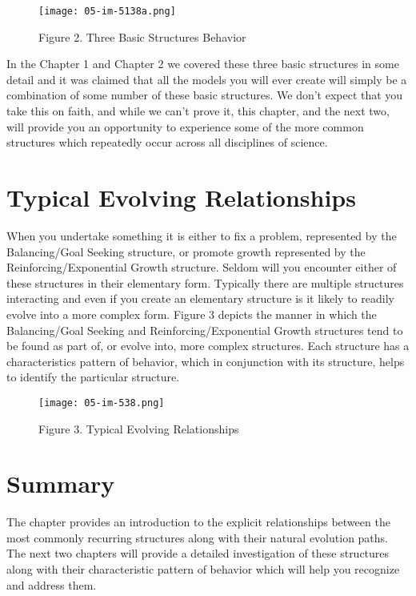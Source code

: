 \documentclass[]{memoir}
\let\Oldincludegraphics\includegraphics
\renewcommand{\includegraphics}[1]{\Oldincludegraphics[max size={\textwidth}{\textheight}]{#1}}
\begin{document}
\begin{figure}[htbp]
\centering
\texttt{[image: 05-im-5138a.png]}
\caption{Figure 2. Three Basic Structures Behavior}
\end{figure}

In the Chapter 1 and Chapter 2 we covered these three basic structures
in some detail and it was claimed that all the models you will ever
create will simply be a combination of some number of these basic
structures. We don't expect that you take this on faith, and while we
can't prove it, this chapter, and the next two, will provide you an
opportunity to experience some of the more common structures which
repeatedly occur across all disciplines of science.

\section{Typical Evolving Relationships}

When you undertake something it is either to fix a problem, represented
by the Balancing/Goal Seeking structure, or promote growth represented
by the Reinforcing/Exponential Growth structure. Seldom will you
encounter either of these structures in their elementary form. Typically
there are multiple structures interacting and even if you create an
elementary structure is it likely to readily evolve into a more complex
form. Figure 3 depicts the manner in which the Balancing/Goal Seeking
and Reinforcing/Exponential Growth structures tend to be found as part
of, or evolve into, more complex structures. Each structure has a
characteristics pattern of behavior, which in conjunction with its
structure, helps to identify the particular structure.

\begin{figure}[htbp]
\centering
\texttt{[image: 05-im-538.png]}
\caption{Figure 3. Typical Evolving Relationships}
\end{figure}

\section{Summary}

The chapter provides an introduction to the explicit relationships
between the most commonly recurring structures along with their natural
evolution paths. The next two chapters will provide a detailed
investigation of these structures along with their characteristic
pattern of behavior which will help you recognize and address them.
\end{document}
